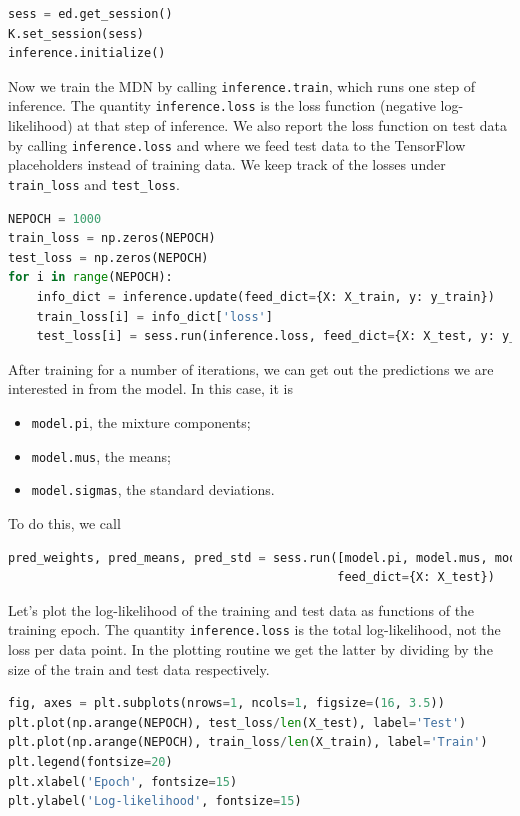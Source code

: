 \begin{lstlisting}[language=Python]
sess = ed.get_session()
K.set_session(sess)
inference.initialize()
\end{lstlisting}

Now we train the MDN by calling \texttt{inference.train}, which runs
one step of inference. The quantity \texttt{inference.loss} is the
loss function (negative log-likelihood) at that step of inference.  We
also report the loss function on test data by calling
\texttt{inference.loss} and where we feed test data to the TensorFlow
placeholders instead of training data.
We keep track of the losses under \texttt{train\_loss} and \texttt{test\_loss}.

\begin{lstlisting}[language=Python]
NEPOCH = 1000
train_loss = np.zeros(NEPOCH)
test_loss = np.zeros(NEPOCH)
for i in range(NEPOCH):
    info_dict = inference.update(feed_dict={X: X_train, y: y_train})
    train_loss[i] = info_dict['loss']
    test_loss[i] = sess.run(inference.loss, feed_dict={X: X_test, y: y_test})
\end{lstlisting}

After training for a number of iterations,
we can get out the predictions we are interested in from
the model. In this case, it is

\begin{itemize}
\item
\texttt{model.pi}, the mixture components;
\item
\texttt{model.mus}, the means;
\item
\texttt{model.sigmas}, the standard deviations.
\end{itemize}

To do this, we call
\begin{lstlisting}[language=Python]
pred_weights, pred_means, pred_std = sess.run([model.pi, model.mus, model.sigmas],
                                              feed_dict={X: X_test})
\end{lstlisting}

Let's plot the log-likelihood of the training and test data as
functions of the training epoch. The quantity \texttt{inference.loss}
is the total log-likelihood, not the loss per data point.  In the
plotting routine we get the latter by dividing by the size of the
train and test data respectively.

\begin{lstlisting}[language=Python]
fig, axes = plt.subplots(nrows=1, ncols=1, figsize=(16, 3.5))
plt.plot(np.arange(NEPOCH), test_loss/len(X_test), label='Test')
plt.plot(np.arange(NEPOCH), train_loss/len(X_train), label='Train')
plt.legend(fontsize=20)
plt.xlabel('Epoch', fontsize=15)
plt.ylabel('Log-likelihood', fontsize=15)
\end{lstlisting}

